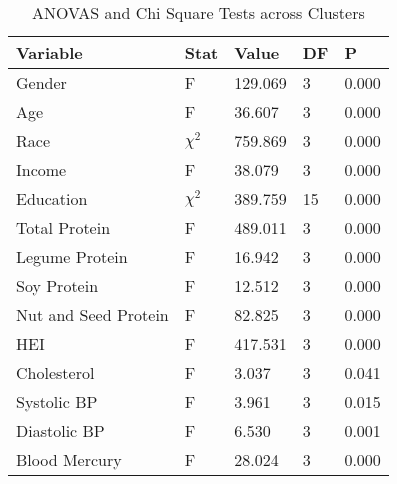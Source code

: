\begin{table}[h]
\caption{ANOVAS and Chi Square Tests across Clusters}
\label{tab:anova_table}
\begin{tabular}{lllll}
\toprule
Variable & Stat & Value & DF & P \\
\midrule
Gender & F & 129.069 & 3 & 0.000 \\
Age & F & 36.607 & 3 & 0.000 \\
Race & $\chi^2$ & 759.869 & 3 & 0.000 \\
Income & F & 38.079 & 3 & 0.000 \\
Education & $\chi^2$ & 389.759 & 15 & 0.000 \\
Total Protein & F & 489.011 & 3 & 0.000 \\
Legume Protein & F & 16.942 & 3 & 0.000 \\
Soy Protein & F & 12.512 & 3 & 0.000 \\
Nut and Seed Protein & F & 82.825 & 3 & 0.000 \\
HEI & F & 417.531 & 3 & 0.000 \\
Cholesterol & F & 3.037 & 3 & 0.041 \\
Systolic BP & F & 3.961 & 3 & 0.015 \\
Diastolic BP & F & 6.530 & 3 & 0.001 \\
Blood Mercury & F & 28.024 & 3 & 0.000 \\
\bottomrule
\end{tabular}
\end{table}
